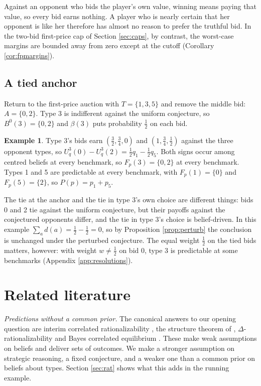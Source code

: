 \documentclass[12pt]{article}
\theoremstyle{definition}
\newtheorem{example}{Example}
\begin{document}
Against an opponent who bids the player's own value, winning means paying that value, so every bid earns nothing. A player who is nearly certain that her opponent is like her therefore has almost no reason to prefer the truthful bid. In the two-bid first-price cap of Section \ref{sec:caps}, by contrast, the worst-case margins are bounded away from zero except at the cutoff (Corollary \ref{cor:fpmargins}).

\subsection{A tied anchor}\label{sec:tied}

Return to the first-price auction with $T = \{1, 3, 5\}$ and remove the middle bid: $A = \{0, 2\}$. Type 3 is indifferent against the uniform conjecture, so $B^0(3) = \{0, 2\}$ and $\beta(3)$ puts probability $\tfrac12$ on each bid.

\begin{example}\label{ex:tied}
Type 3's bids earn $(\tfrac32, \tfrac34, 0)$ and $(1, \tfrac34, \tfrac12)$ against the three opponent types, so $U^3_q(0) - U^3_q(2) = \tfrac12 q_1 - \tfrac12 q_5$. Both signs occur among centred beliefs at every benchmark, so $F_p(3) = \{0, 2\}$ at every benchmark. Types 1 and 5 are predictable at every benchmark, with $F_p(1) = \{0\}$ and $F_p(5) = \{2\}$, so $P(p) = p_1 + p_5$.
\end{example}

The tie at the anchor and the tie in type 3's own choice are different things: bids 0 and 2 tie against the uniform conjecture, but their payoffs against the conjectured opponents differ, and the tie in type 3's choice is belief-driven. In this example $\sum_a d(a) = \tfrac12 - \tfrac12 = 0$, so by Proposition \ref{prop:perturb} the conclusion is unchanged under the perturbed conjecture. The equal weight $\tfrac12$ on the tied bids matters, however: with weight $w \neq \tfrac12$ on bid 0, type 3 is predictable at some benchmarks (Appendix \ref{app:resolutions}).

\section{Related literature}\label{sec:literature}

\emph{Predictions without a common prior.} The canonical answers to our opening question are interim correlated rationalizability \citep{dfm2007icr}, the structure theorem of \citet{weinsteinyildiz2007}, $\Delta$-rationalizability \citep{battigallisiniscalchi2003} and Bayes correlated equilibrium \citep{bergemannmorris2013}. These make weak assumptions on beliefs and deliver sets of outcomes. We make a stronger assumption on strategic reasoning, a fixed conjecture, and a weaker one than a common prior on beliefs about types. Section \ref{sec:rat} shows what this adds in the running example.
\end{document}
